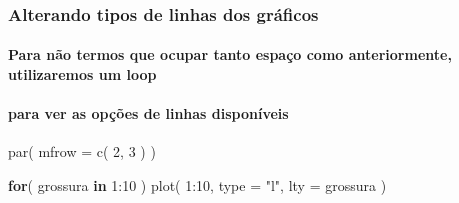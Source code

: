 \documentclass[
]{article}
\newenvironment{Shaded}{\begin{snugshade}}{\end{snugshade}}
\newcommand{\AttributeTok}[1]{\textcolor[rgb]{0.77,0.63,0.00}{#1}}
\newcommand{\ControlFlowTok}[1]{\textcolor[rgb]{0.13,0.29,0.53}{\textbf{#1}}}
\newcommand{\DecValTok}[1]{\textcolor[rgb]{0.00,0.00,0.81}{#1}}
\newcommand{\FunctionTok}[1]{\textcolor[rgb]{0.00,0.00,0.00}{#1}}
\newcommand{\NormalTok}[1]{#1}
\newcommand{\SpecialCharTok}[1]{\textcolor[rgb]{0.00,0.00,0.00}{#1}}
\newcommand{\StringTok}[1]{\textcolor[rgb]{0.31,0.60,0.02}{#1}}
\begin{document}
\hypertarget{alterando-tipos-de-linhas-dos-gruxe1ficos}{%
\subsubsection{Alterando tipos de linhas dos
gráficos}\label{alterando-tipos-de-linhas-dos-gruxe1ficos}}

\hypertarget{para-nuxe3o-termos-que-ocupar-tanto-espauxe7o-como-anteriormente-utilizaremos-um-loop}{%
\paragraph{Para não termos que ocupar tanto espaço como anteriormente,
utilizaremos um
loop}\label{para-nuxe3o-termos-que-ocupar-tanto-espauxe7o-como-anteriormente-utilizaremos-um-loop}}

\hypertarget{para-ver-as-opuxe7uxf5es-de-linhas-disponuxedveis}{%
\paragraph{para ver as opções de linhas
disponíveis}\label{para-ver-as-opuxe7uxf5es-de-linhas-disponuxedveis}}

\begin{Shaded}
\begin{Highlighting}[]
\FunctionTok{par}\NormalTok{( }\AttributeTok{mfrow =} \FunctionTok{c}\NormalTok{( }\DecValTok{2}\NormalTok{, }\DecValTok{3}\NormalTok{ ) )}

\ControlFlowTok{for}\NormalTok{( grossura }\ControlFlowTok{in} \DecValTok{1}\SpecialCharTok{:}\DecValTok{10}\NormalTok{ ) }\FunctionTok{plot}\NormalTok{( }\DecValTok{1}\SpecialCharTok{:}\DecValTok{10}\NormalTok{, }\AttributeTok{type =} \StringTok{"l"}\NormalTok{, }\AttributeTok{lty =}\NormalTok{ grossura )}
\end{Highlighting}
\end{Shaded}
\end{document}
